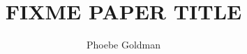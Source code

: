 \title{FIXME PAPER TITLE}
\author{Phoebe Goldman}
\date{} %

\newcommand{\theprof}{FIXME PROFESSSOR NAME}
\newcommand{\theclass}{FIXME CLASS TITLE}
